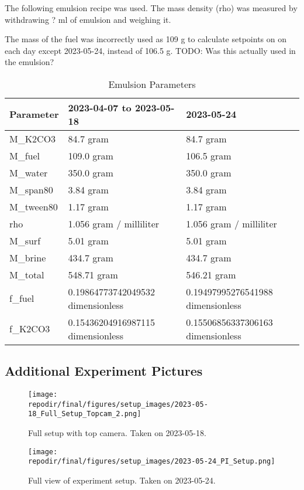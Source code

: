 The following emulsion recipe was used. The mass density (rho) was measured by withdrawing ? ml of emulsion and weighing it. 

The mass of the fuel was incorrectly used as 109 g to calculate setpoints on on each day except 2023-05-24, instead of 106.5 g. TODO: Was this actually used in the emulsion?



\begin{table}[h]
\centering
\begin{tabular}{|l|l|l|}
\hline
\textbf{Parameter} & \textbf{2023-04-07 to 2023-05-18} & \textbf{2023-05-24} \\
\hline
M\_K2CO3 & 84.7 gram & 84.7 gram \\
M\_fuel & 109.0 gram & 106.5 gram \\
M\_water & 350.0 gram & 350.0 gram \\
M\_span80 & 3.84 gram & 3.84 gram \\
M\_tween80 & 1.17 gram & 1.17 gram \\
rho & 1.056 gram / milliliter & 1.056 gram / milliliter \\
M\_surf & 5.01 gram & 5.01 gram \\
M\_brine & 434.7 gram & 434.7 gram \\
M\_total & 548.71 gram & 546.21 gram \\
f\_fuel & 0.19864773742049532 dimensionless & 0.19497995276541988 dimensionless \\
f\_K2CO3 & 0.15436204916987115 dimensionless & 0.15506856337306163 dimensionless \\
\hline
\end{tabular}
\caption{Emulsion Parameters}
\label{tab:emulsion_parameters}
\end{table}

\subsection{Additional Experiment Pictures}

\begin{figure}[]
\centering
\texttt{[image: \\repodir/final/figures/setup\_images/2023-05-18\_Full\_Setup\_Topcam\_2.png]}
\caption{Full setup with top camera. Taken on 2023-05-18.}
\label{fig:SI_Full_Setup_Topcam}
\end{figure}

\begin{figure}[]
\centering
\texttt{[image: \\repodir/final/figures/setup\_images/2023-05-24\_PI\_Setup.png]}
\caption{Full view of experiment setup. Taken on 2023-05-24.}
\label{fig:SI_Full_Setup_PI}
\end{figure}

